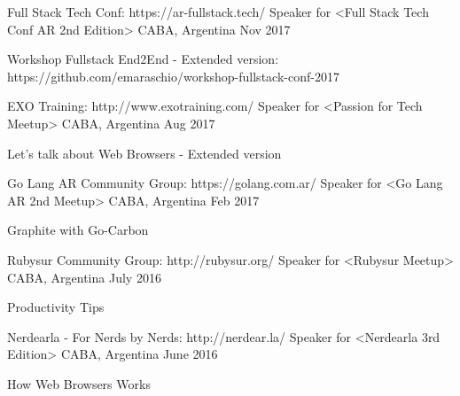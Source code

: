 
\begin{cventries}
  \cventry
    {Full Stack Tech Conf: https://ar-fullstack.tech/}
    {Speaker for <Full Stack Tech Conf AR 2nd Edition>}
    {CABA, Argentina}
    {Nov 2017}
    {
      \begin{cvitems}
        \item {Workshop Fullstack End2End - Extended version: https://github.com/emaraschio/workshop-fullstack-conf-2017}
      \end{cvitems}
    }

  \cventry
    {EXO Training: http://www.exotraining.com/ }
    {Speaker for <Passion for Tech Meetup>}
    {CABA, Argentina}
    {Aug 2017}
    {
      \begin{cvitems}
        \item {Let's talk about Web Browsers - Extended version}
      \end{cvitems}
    }


  \cventry
    {Go Lang AR Community Group: https://golang.com.ar/ }
    {Speaker for <Go Lang AR 2nd Meetup>}
    {CABA, Argentina}
    {Feb 2017}
    {
      \begin{cvitems}
        \item {Graphite with Go-Carbon}
      \end{cvitems}
    }

  \cventry
    {Rubysur Community Group: http://rubysur.org/}
    {Speaker for <Rubysur Meetup>}
    {CABA, Argentina}
    {July 2016}
    {
      \begin{cvitems}
        \item {Productivity Tips}
      \end{cvitems}
    }

  \cventry
    {Nerdearla - For Nerds by Nerds: http://nerdear.la/}
    {Speaker for <Nerdearla 3rd Edition>}
    {CABA, Argentina}
    {June 2016}
    {
      \begin{cvitems}
        \item {How Web Browsers Works}
      \end{cvitems}
    }


\end{cventries}
